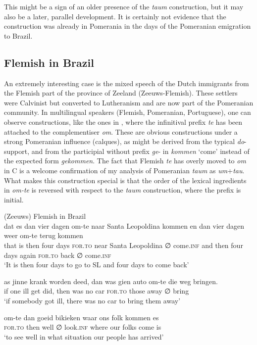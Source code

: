 \documentclass[output=paper,hidelinks,draftmode]{langscibook}
\begin{document}
This might be a sign of an older presence of the \textit{taum} construction, but it may also be a later, parallel development. It is certainly not evidence that the construction was already in Pomerania in the days of the Pomeranian emigration to Brazil.

\subsection{Flemish in Brazil}\label{flemish}

An extremely interesting case is the mixed speech of the Dutch immigrants from the Flemish part of the province of Zeeland (Zeeuws-Flemish). These settlers were Calvinist but converted to Lutheranism and are now part of the Pomeranian community. In multilingual speakers (Flemish, Pomeranian, Portuguese), one can observe constructions, like the ones in , where the infinitival prefix \textit{te} has been attached to the complementiser \textit{om}. These are obvious constructions under a strong Pomeranian influence (calques), as might be derived from the typical \textit{do}-support, and from the participial without prefix \textit{ge}{}- in \textit{kommen} `come' instead of the expected form \textit{gekommen}. The fact that Flemish \textit{te} has overly moved to \textit{om} in C is a welcome confirmation of my analysis of Pomeranian \textit{taum} as \textit{um}+\textit{tau}. What makes this construction special is that the order of the lexical ingredients in \textit{om-te} is reversed with respect to the \textit{taum} construction, where the prefix is initial.


\newpage
\ea\label{ex:postma:15} (Zeeuws) Flemish in Brazil\\
\ea \gll dat es dan vier dagen om-te naar Santa Leopoldina {} kommen en dan vier dagen weer om-te terug {} kommen\\
     that is then four days \textsc{for.to} near Santa Leopoldina ∅ come.\textsc{inf} and then four days again \textsc{for.to} back ∅ come.\textsc{inf}\\
\glt `It is then four days to go to SL and four days to come back'

\ex \gll as jinne krank worden deed, dan was gien auto om-te die weg {} bringen.\\
     if one ill get did, then was no car \textsc{for.to} those away ∅ bring\\
\glt `if somebody got ill, there was no car to bring them away'

\ex \gll om-te dan goeid {} bikieken waar ons folk kommen es\\
     \textsc{for.to} then well ∅ look.\textsc{inf} where our folks come is\\
\glt `to see well in what situation our people has arrived' \z\z
\end{document}
